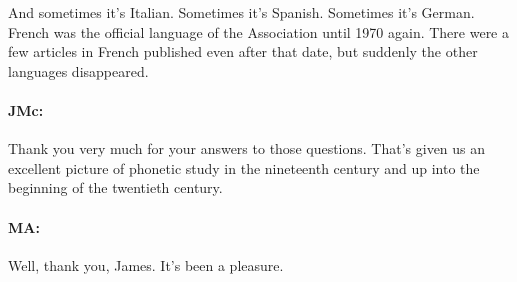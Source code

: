 \documentclass[output=paper]{langscibook}
\begin{document}
And sometimes it’s Italian. Sometimes it’s Spanish. Sometimes it’s German. French was the official language of the Association until 1970 again. There were a few articles in French published even after that date, but suddenly the other languages disappeared.

\paragraph*{JMc:} Thank you very much for your answers to those questions. That’s given us an excellent picture of phonetic study in the nineteenth century and up into the beginning of the twentieth century.

\paragraph*{MA:} Well, thank you, James. It’s been a pleasure.

\nocite{bruecke1856a}
\nocite{bunsen1854a}
\nocite{helmholtz1885a}
\nocite{lepsius1863a}
\nocite{mueller1864a}
\nocite{rousselot1891a}
\nocite{sievers1876a}
\nocite{Sweet1877}
\nocite{vietor1882a}
\nocite{ashby2016a}
\nocite{ashby2020a}
\nocite{kemp2006a}
\nocite{kohler1981a}
\nocite{leopold1999a}
\nocite{macmahon1986a}
\nocite{mcelvenny2019a}


\sloppy
\PrintPrimarySources{}
\PrintSecondarySources{}
\end{document}
